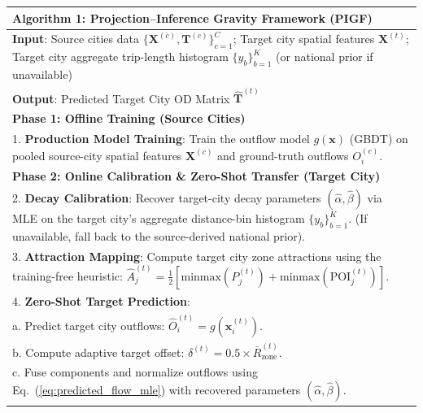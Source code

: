 \begin{table}[t]
\centering
\tablebodyfont\small
\begin{tabular}{p{}}
\toprule
\textbf{Algorithm 1: Projection--Inference Gravity Framework (PIGF)} \\
\midrule
\textbf{Input}: Source cities data $\{\mathbf{X}^{(c)}, \mathbf{T}^{(c)}\}_{c=1}^{C}$; Target city spatial features $\mathbf{X}^{(t)}$; Target city aggregate trip-length histogram $\{y_b\}_{b=1}^{K}$ (or national prior if unavailable) \\
\textbf{Output}: Predicted Target City OD Matrix $\mathbf{\hat{T}}^{(t)}$ \\
\midrule
\textbf{Phase 1: Offline Training (Source Cities)} \\
1. \textbf{Production Model Training}: Train the outflow model $g(\mathbf{x})$ (GBDT) on pooled source-city spatial features $\mathbf{X}^{(c)}$ and ground-truth outflows $O_i^{(c)}$. \\
\midrule
\textbf{Phase 2: Online Calibration \& Zero-Shot Transfer (Target City)} \\
2. \textbf{Decay Calibration}: Recover target-city decay parameters $(\hat{\alpha}, \hat{\beta})$ via MLE on the target city's aggregate distance-bin histogram $\{y_b\}_{b=1}^{K}$. (If unavailable, fall back to the source-derived national prior). \\
3. \textbf{Attraction Mapping}: Compute target city zone attractions using the training-free heuristic: $\hat{A}_j^{(t)} = \frac{1}{2} \left[ \mathrm{minmax}(P_j^{(t)}) + \mathrm{minmax}(\mathrm{POI}_j^{(t)}) \right]$. \\
4. \textbf{Zero-Shot Target Prediction}: \\
\hspace{1em} a. Predict target city outflows: $\hat{O}_i^{(t)} = g(\mathbf{x}_i^{(t)})$. \\
\hspace{1em} b. Compute adaptive target offset: $\delta^{(t)} = 0.5 \times \bar{R}_{\mathrm{zone}}^{(t)}$. \\
\hspace{1em} c. Fuse components and normalize outflows using Eq.~(\ref{eq:predicted_flow_mle}) with recovered parameters $(\hat{\alpha}, \hat{\beta})$. \\
\bottomrule
\end{tabular}
\end{table}
